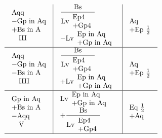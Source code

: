 \documentclass[11pt,a4paper]{article}
\begin{document}
\[\begin{array}{l|l|l}
\begin{array}{l} \text{Aqq} \\ -\text{Gp in Aq} \\ +\text{Bs in A} \\ \quad\text{III} \end{array} & \begin{array}{l} \dfrac{\text{Bs}}{\text{Lv}\begin{array}{l} \text{Ep4} \\ +\text{Gp4} \end{array}} \\ -\text{Lv}\begin{array}{l} \text{Ep in Aq} \\ +\text{Gp in Aq} \end{array} \end{array} & \begin{array}{l} \text{Aq} \\ +\text{Ep } \tfrac{1}{2} \end{array} \\ \hline
\begin{array}{l} \text{Aqq} \\ -\text{Gp in Aq} \\ -\text{Bs in A} \\ \quad\text{IIII} \end{array} & \begin{array}{l} \dfrac{\text{Bs}}{\text{Lv}\begin{array}{l} \text{Ep4} \\ +\text{Gp4} \end{array}} \\ +\text{Lv}\begin{array}{l} \text{Ep in Aq} \\ +\text{Gp in Aq} \end{array} \end{array} & \begin{array}{l} \text{Aq} \\ +\text{Ep } \tfrac{1}{2} \end{array} \\ \hline
\begin{array}{l} \text{Gp in Aq} \\ +\text{Bs in A} \\ -\text{Aqq} \\ \quad\text{V} \end{array} & \begin{array}{l} \text{Lv}\begin{array}{l} \text{Ep in Aq} \\ +\text{Gp in Aq} \end{array} \\ +\dfrac{\text{Bs}}{\text{Lv}\begin{array}{l} \text{Ep4} \\ +\text{Gp4} \end{array}} \end{array} & \begin{array}{l} \text{Eq } \tfrac{1}{2} \\ +\text{Aq} \end{array} \\ \hline

\end{array}\]
\end{document}
